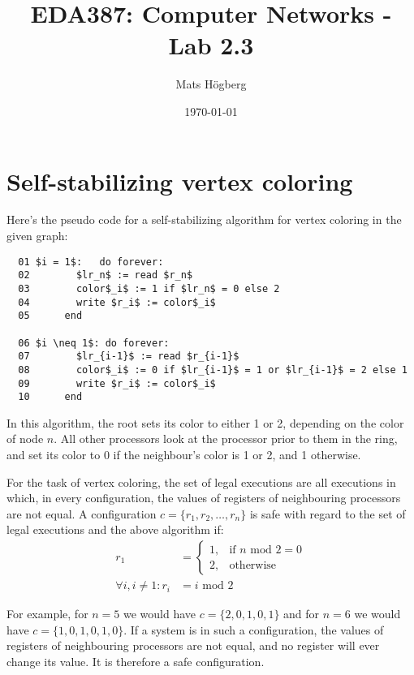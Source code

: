 \documentclass{article}
\title{EDA387: Computer Networks - Lab 2.3}
\author{Mats Högberg}
\date{\today}
\begin{document}
\maketitle

\section*{Self-stabilizing vertex coloring}

Here's the pseudo code for a self-stabilizing algorithm for vertex coloring in the given graph:

\begin{lstlisting}
  01 $i = 1$:   do forever:
  02        $lr_n$ := read $r_n$
  03        color$_i$ := 1 if $lr_n$ = 0 else 2
  04        write $r_i$ := color$_i$
  05      end

  06 $i \neq 1$: do forever:
  07        $lr_{i-1}$ := read $r_{i-1}$
  08        color$_i$ := 0 if $lr_{i-1}$ = 1 or $lr_{i-1}$ = 2 else 1
  09        write $r_i$ := color$_i$
  10      end
\end{lstlisting}

In this algorithm, the root sets its color to either 1 or 2, depending on the color of node $n$. All other processors look at the processor prior to them in the ring, and set its color to 0 if the neighbour's color is 1 or 2, and 1 otherwise.

For the task of vertex coloring, the set of legal executions are all executions in which, in every configuration, the values of registers of neighbouring processors are not equal. A configuration $c = \{r_1, r_2, \ldots, r_n\}$ is safe with regard to the set of legal executions and the above algorithm if:
\begin{align*}
  r_1 &= \begin{cases}
    1, & \text{if } n \text{ mod } 2 = 0 \\
    2, & \text{otherwise}
  \end{cases} \\
  \forall i, i \neq 1 : r_i &= i \text{ mod } 2
\end{align*}

For example, for $n = 5$ we would have $c = \{2, 0, 1, 0, 1\}$ and for $n = 6$ we would have $c = \{1, 0, 1, 0, 1, 0\}$. If a system is in such a configuration, the values of registers of neighbouring processors are not equal, and no register will ever change its value. It is therefore a safe configuration.
\end{document}
